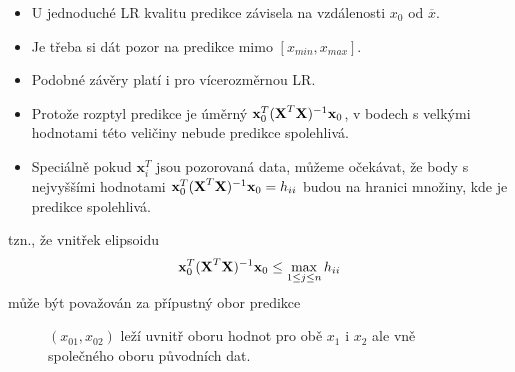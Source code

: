 \begin{example}
	\begin{remark}[Extrapolace]
	    \begin{itemize}
	    \item U jednoduché LR kvalitu predikce závisela na vzdálenosti $ x_0 $ od $ \overline{x} $.
	    \item Je třeba si dát pozor na predikce mimo $ [x_{min},x_{max}] $.
	    \item Podobné závěry platí i pro vícerozměrnou LR.
	    \item Protože rozptyl predikce je úměrný $ \textbf{x}_0^{T}( \textbf{X} ^{T} \textbf{X} )^{-1} \textbf{x}_0 $, v bodech s velkými hodnotami této veličiny nebude predikce spolehlivá.
	    \item Speciálně pokud $ \textbf{x}_i^T $ jsou pozorovaná data, můžeme očekávat, že body s nejvyššími hodnotami $ \textbf{x}_0^{T}( \textbf{X} ^{T} \textbf{X} )^{-1} \textbf{x}_0 = h_{ii} $ budou na hranici množiny, kde je predikce spolehlivá.
	    \end{itemize}
	    tzn., že vnitřek elipsoidu 
	    $$
	       \textbf{x}_0^{T}( \textbf{X} ^{T} \textbf{X} )^{-1} \textbf{x}_0 \leq     \max_{1 \leq j \leq n} h_{ii}
	    $$
	    může být považován za přípustný obor predikce
	    \begin{figure}[h]
	\centering
    \caption{ $(x_{01},x_{02})$ leží uvnitř oboru hodnot pro obě $ x_1 $ i $ x_2 $ ale vně společného oboru původních dat.}
\end{figure}
	\end{remark}
\end{example}